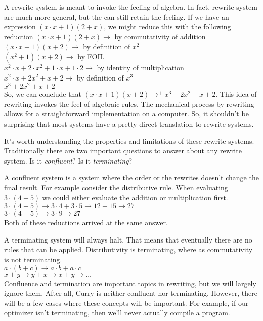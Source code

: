 \documentclass{article}
\begin{document}
A rewrite system is meant to invoke the feeling of algebra.
In fact, rewrite system are much more general, but the can still retain the feeling.
If we have an expression $(x\cdot x + 1)(2 + x)$, we might reduce this with the following reduction
$(x\cdot x + 1)(2 + x) \rightarrow$ by commutativity of addition\\
$(x\cdot x + 1)(x + 2) \rightarrow$ by definition of $x^2$\\
$(x^2 + 1)(x + 2) \rightarrow$ by FOIL\\
$x^2\cdot x + 2\cdot x^2 + 1\cdot x + 1 \cdot 2 \rightarrow$ by identity of multiplication\\
$x^2\cdot x + 2x^2 + x + 2 \rightarrow$ by definition of $x^3$\\
$x^3 + 2x^2 + x + 2$ \\

So, we can conclude that $(x\cdot x + 1)(x + 2) \rightarrow^+ x^3 + 2x^2 + x + 2$.
This idea of rewriting invokes the feel of algebraic rules.
The mechanical process by rewriting allows for a straightforward implementation on a computer.
So, it shouldn't be surprising that most systems have a pretty direct translation to rewrite systems.

It's worth understanding the properties and limitations of these rewrite systems.
Traditionally there are two important questions to answer about any rewrite system.
Is it \textit{confluent}? Is it \textit{terminating}?

A confluent system is a system where the order or the rewrites doesn't change the final result.
For example consider the distributive rule.
When evaluating $3\cdot(4 + 5)$ we could either evaluate the addition or multiplication first.\\
$3\cdot(4 + 5) \rightarrow 3\cdot 4 + 3\cdot 5 \rightarrow 12 + 15 \rightarrow 27$\\
$3\cdot(4 + 5) \rightarrow 3\cdot 9 \rightarrow 27$\\
Both of these reductions arrived at the same answer.

A terminating system will always halt.
That means that eventually there are no rules that can be applied.
Distributivity is terminating, where as commutativity is not terminating.\\
$a\cdot (b + c) \rightarrow a\cdot b + a\cdot c$\\
$x + y \rightarrow y + x \rightarrow x + y \rightarrow \ldots$\\

Confluence and termination are important topics in rewriting, but we will largely ignore them.
After all, Curry is neither confluent nor terminating.
However, there will be a few cases where these concepts will be important.
For example, if our optimizer isn't terminating, then we'll never actually compile a program.
\end{document}
